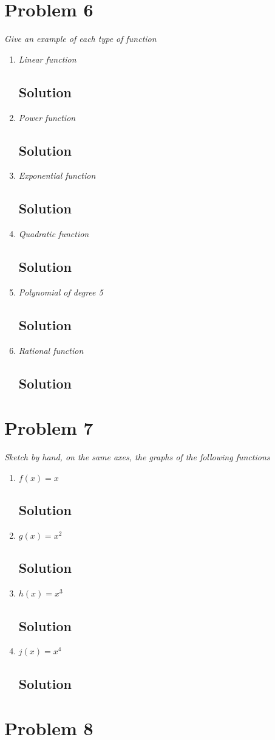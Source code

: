 \documentclass[11pt]{article}
\newcommand{\soln}{\subsection*}
\newcommand{\qn}{\textit}
\begin{document}
\section*{Problem 6}

\qn{Give an example of each type of function}
\begin{enumerate}
	\item \qn{Linear function}
	\soln{Solution}
	
	\item \qn{Power function}
	\soln{Solution}
	
	\item \qn{Exponential function}
	\soln{Solution}
	
	\item \qn{Quadratic function}
	\soln{Solution}
	
	\item \qn{Polynomial of degree 5}
	\soln{Solution}
	
	\item \qn{Rational function}
	\soln{Solution}
\end{enumerate}

\section*{Problem 7}

\qn{Sketch by hand, on the same axes, the graphs of the following functions}
\begin{enumerate}
	\item \qn{$f(x)=x$}
	\soln{Solution}
	
	\item \qn{$g(x)=x^2$}
	\soln{Solution}
	
	\item \qn{$h(x)=x^3$}
	\soln{Solution}
	
	\item \qn{$j(x)=x^4$}
	\soln{Solution}
\end{enumerate}

\section*{Problem 8}
\end{document}
